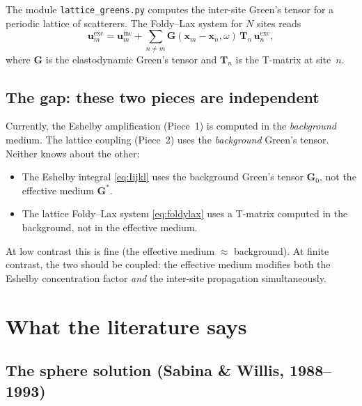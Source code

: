 \documentclass[11pt,a4paper]{article}
\newcommand{\bG}{\bm{G}}
\newcommand{\bT}{\bm{T}}
\newcommand{\bu}{\bm{u}}
\begin{document}
The module \texttt{lattice\_greens.py} computes the inter-site
Green's tensor for a periodic lattice of scatterers.  The Foldy--Lax
system for $N$ sites reads
\begin{equation}\label{eq:foldylax}
  \bu_m^{\text{exc}} = \bu_m^{\text{inc}}
    + \sum_{n \neq m} \bG(\bm{x}_m - \bm{x}_n,\omega)\,
      \bT_n\,\bu_n^{\text{exc}},
\end{equation}
where $\bG$ is the elastodynamic Green's tensor and $\bT_n$ is the
T-matrix at site~$n$.

\subsection{The gap: these two pieces are independent}

Currently, the Eshelby amplification (Piece~1) is computed in the
\emph{background} medium.  The lattice coupling (Piece~2) uses the
\emph{background} Green's tensor.  Neither knows about the other:
\begin{itemize}[nosep]
  \item The Eshelby integral \eqref{eq:Iijkl} uses the background
    Green's tensor $\bG_0$, not the effective medium $\bG^*$.
  \item The lattice Foldy--Lax system \eqref{eq:foldylax} uses a
    T-matrix computed in the background, not in the effective medium.
\end{itemize}
At low contrast this is fine (the effective medium $\approx$ background).
At finite contrast, the two should be coupled: the effective medium
modifies both the Eshelby concentration factor \emph{and} the
inter-site propagation simultaneously.

\section{What the literature says}
\label{sec:literature}

\subsection{The sphere solution (Sabina \& Willis, 1988--1993)}
\end{document}
